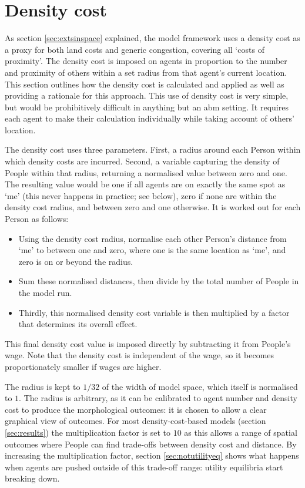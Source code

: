 \section{Density cost \label{sec:densitycostsetupFramework}}

As section \ref{sec:extsinspace} explained, the model framework uses a density cost as a proxy for both land costs and generic congestion, covering all `costs of proximity'. The density cost is imposed on agents in proportion to the number and proximity of others within a set radius from that agent's current location. This section outlines how the density cost is calculated and applied as well as providing a rationale for this approach. This use of density cost is very simple, but would be prohibitively difficult in anything but an \gls{abm} setting. It requires each agent to make their calculation individually while taking account of others' location. 

The density cost uses three parameters. First, a radius around each Person within which density costs are incurred. Second, a variable capturing the density of People within that radius, returning a normalised value between zero and one. The resulting value would be one if all agents are on exactly the same spot as `me' (this never happens in practice; see below), zero if none are within the density cost radius, and between zero and one otherwise. It is worked out for each Person as follows:

\begin{itemize}
\item Using the density cost radius, normalise each other Person's distance from `me' to between one and zero, where one is the same location as `me', and zero is on or beyond the radius.
\item Sum these normalised distances, then divide by the total number of People in the model run.
\item Thirdly, this normalised density cost variable is then multiplied by a factor that determines its overall effect. 
\end{itemize}

This final density cost value is imposed directly by subtracting it from People's wage. Note that the density cost is independent of the wage, so it becomes proportionately smaller if wages are higher. 

The radius is kept to $1/32$ of the width of model space, which itself is normalised to $1$. The radius is arbitrary, as it can be calibrated to agent number and density cost to produce the morphological outcomes: it is chosen to allow a clear graphical view of outcomes. For most density-cost-based models (section \ref{sec:results})  the multiplication factor is set to $10$ as this allows a range of spatial outcomes where People can find trade-offs between density cost and distance. By increasing the multiplication factor, section \ref{sec:notutilityeq} shows what happens when agents are pushed outside of this trade-off range: utility equilibria start breaking down.

